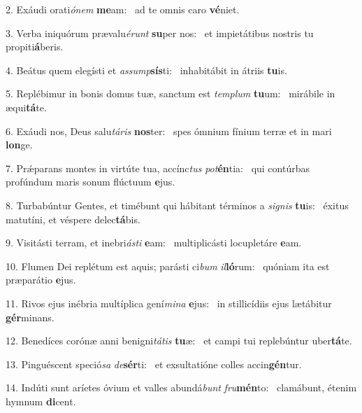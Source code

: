 2. Exáudi orati\textit{ó}\textit{nem} \textbf{me}am: \ast\  ad te omnis caro \textbf{vé}niet.\

3. Verba iniquórum prævalu\textit{é}\textit{runt} \textbf{su}per nos: \ast\  et impietátibus nostris tu propiti\textbf{á}beris.\

4. Beátus quem elegísti et \textit{as}\textit{sump}\textbf{sís}ti: \ast\  inhabitábit in átriis \textbf{tu}is.\

5. Replébimur in bonis domus tuæ, sanctum est \textit{tem}\textit{plum} \textbf{tu}um: \ast\  mirábile in æqui\textbf{tá}te.\

6. Exáudi nos, Deus salu\textit{tá}\textit{ris} \textbf{nos}ter: \ast\  spes ómnium fínium terræ et in mari \textbf{lon}ge.\

7. Prǽparans montes in virtúte tua, accínc\textit{tus} \textit{pot}\textbf{én}tia: \ast\  qui contúrbas profúndum maris sonum flúctuum \textbf{e}jus.\

8. Turbabúntur Gentes, et timébunt qui hábitant términos a \textit{si}\textit{gnis} \textbf{tu}is: \ast\  éxitus matutíni, et véspere delec\textbf{tá}bis.\

9. Visitásti terram, et inebri\textit{ás}\textit{ti} \textbf{e}am: \ast\  multiplicásti locupletáre \textbf{e}am.\

10. Flumen Dei replétum est aquis; parásti ci\textit{bum} \textit{il}\textbf{ló}rum: \ast\  quóniam ita est præparátio \textbf{e}jus.\

11. Rivos ejus inébria multíplica gení\textit{mi}\textit{na} \textbf{e}jus: \ast\  in stillicídiis ejus lætábitur \textbf{gér}minans.\

12. Benedíces corónæ anni benigni\textit{tá}\textit{tis} \textbf{tu}æ: \ast\  et campi tui replebúntur uber\textbf{tá}te.\

13. Pinguéscent speció\textit{sa} \textit{de}\textbf{sér}ti: \ast\  et exsultatióne colles accin\textbf{gén}tur.\

14. Indúti sunt aríetes óvium et valles abundá\textit{bunt} \textit{fru}\textbf{mén}to: \ast\  clamábunt, étenim hymnum \textbf{di}cent.\

